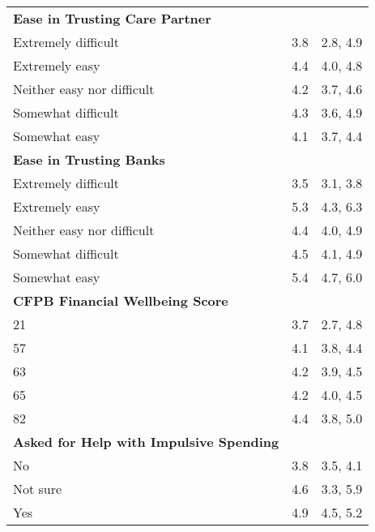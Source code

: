 \begin{longtable}{lcc}
\textbf{Ease in Trusting Care Partner} &  & \\
\hspace{1em}Extremely difficult & 3.8 & 2.8, 4.9\\
\hspace{1em}Extremely easy & 4.4 & 4.0, 4.8\\
\hspace{1em}Neither easy nor difficult & 4.2 & 3.7, 4.6\\
\hspace{1em}Somewhat difficult & 4.3 & 3.6, 4.9\\
\hspace{1em}Somewhat easy & 4.1 & 3.7, 4.4\\

\textbf{Ease in Trusting Banks} &  & \\
\hspace{1em}Extremely difficult & 3.5 & 3.1, 3.8\\
\hspace{1em}Extremely easy & 5.3 & 4.3, 6.3\\
\hspace{1em}Neither easy nor difficult & 4.4 & 4.0, 4.9\\
\hspace{1em}Somewhat difficult & 4.5 & 4.1, 4.9\\
\hspace{1em}Somewhat easy & 5.4 & 4.7, 6.0\\

\textbf{CFPB Financial Wellbeing Score} &  & \\
\hspace{1em}21 & 3.7 & 2.7, 4.8\\
\hspace{1em}57 & 4.1 & 3.8, 4.4\\
\hspace{1em}63 & 4.2 & 3.9, 4.5\\
\hspace{1em}65 & 4.2 & 4.0, 4.5\\
\hspace{1em}82 & 4.4 & 3.8, 5.0\\

\textbf{Asked for Help with Impulsive Spending} &  & \\
\hspace{1em}No & 3.8 & 3.5, 4.1\\
\hspace{1em}Not sure & 4.6 & 3.3, 5.9\\
\hspace{1em}Yes & 4.9 & 4.5, 5.2\\

\end{longtable}
